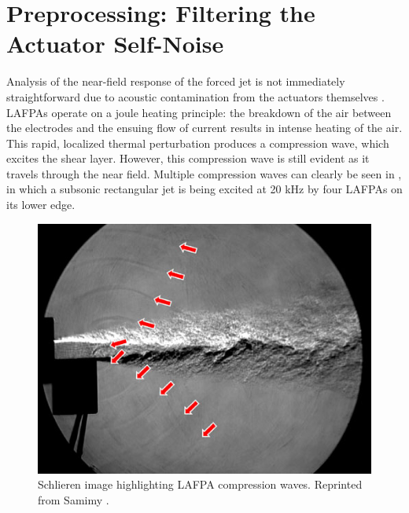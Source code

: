 \section{Preprocessing: Filtering the Actuator Self-Noise}
Analysis of the near-field response of the forced jet is not immediately straightforward due to acoustic contamination from the actuators themselves \citep{Sinha2012}. 
LAFPAs operate on a joule heating principle: the breakdown of the air between the electrodes and the ensuing flow of current results in intense heating of the air. This rapid, localized thermal perturbation produces a compression wave, which excites the shear layer. 
However, this compression wave is still evident as it travels through the near field. 
Multiple compression waves can clearly be seen in , in which a subsonic rectangular jet is being excited at 20 kHz by four LAFPAs on its lower edge. \begin{figure}
	\centering
	\includegraphics{Figures/Samimy2010JFM.jpg}
	\caption{Schlieren image highlighting LAFPA compression waves. Reprinted from Samimy \etal \cite{Samimy2010}.}
	\label{fig:self-noise}
\end{figure}

